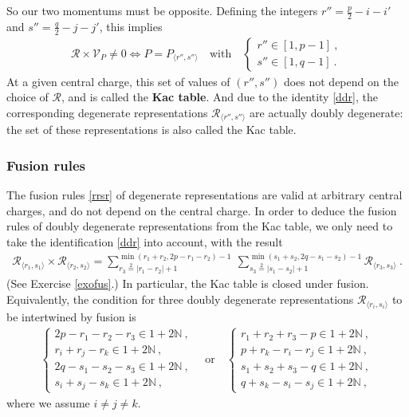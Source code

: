 \documentclass[12pt, a4paper, notitlepage, twoside]{report}
\numberwithin{equation}{section}
\theoremstyle{break}
\begin{document}
So our two momentums must be opposite. Defining the integers $r'' = \frac{p}{2}-i-i'$ and $s''=\frac{q}{2}-j-j'$, this implies
\begin{align}
 \mathcal{R}\times \mathcal{V}_P \neq 0 \iff    P=P_{\langle r'',s'' \rangle}\quad \text{with}\quad  \left\{\begin{array}{l}  r'' \in [1,p-1]\ , \\ s'' \in [1,q-1]\ . \end{array}\right. 
\label{rpsq}
\end{align}
At a given central charge, this set of values of $(r'', s'')$ does not depend on the choice of $\mathcal{R}$, and is called the \textbf{\boldmath Kac table}.
And due to the identity \eqref{ddr},
the corresponding degenerate representations $\mathcal{R}_{\langle r'', s'' \rangle}$ are actually doubly degenerate: the set of these representations is also called the Kac table.

\subsubsection{Fusion rules}

The fusion rules \eqref{rrsr} of degenerate representations are valid at arbitrary central charges, and do not depend on the central charge. In order to deduce the fusion rules of doubly degenerate representations from the Kac table, we only need to take the identification \eqref{ddr} into account, with the result
\begin{align}
  \boxed{\mathcal{R}_{\langle r_1,s_1 \rangle} \times \mathcal{R}_{\langle r_2,s_2 \rangle} = \sum_{r_3\overset{2}{=}|r_1-r_2|+1}^{\min(r_1+r_2,2p-r_1-r_2)-1}\ \sum_{s_3\overset{2}{=}|s_1-s_2|+1}^{\min(s_1+s_2,2q-s_1-s_2)-1} \mathcal{R}_{\langle r_3,s_3 \rangle}}\ .
\label{rrmm}
\end{align}
(See Exercise \ref{exofus}.) In particular, the Kac table is closed under fusion.
Equivalently, 
the condition for three doubly degenerate representations $\mathcal{R}_{\langle r_i,s_i \rangle}$ to be intertwined by fusion is 
\begin{align}
 \left\{\begin{array}{l}  2p-r_1-r_2-r_3\in 1+2{\mathbb{N}}\ , \\
 r_i+r_j-r_k \in 1 + 2{\mathbb{N}}\ , \\
2q-s_1-s_2-s_3\in 1+2{\mathbb{N}}\ , \\
 s_i+s_j-s_k \in 1 + 2{\mathbb{N}}\ , \end{array}\right.  
\quad \text{or} \quad
 \left\{\begin{array}{l}  r_1+r_2+r_3-p\in 1+2{\mathbb{N}}\ , \\
 p+r_k-r_i-r_j\in 1+2{\mathbb{N}} \ , \\
s_1+s_2+s_3-q\in 1+2{\mathbb{N}}\ , \\
 q+s_k-s_i-s_j\in 1+2{\mathbb{N}} \ ,\end{array}\right. 
 \label{mmfr}
\end{align}
where we assume $i\neq j\neq k$.
\end{document}
